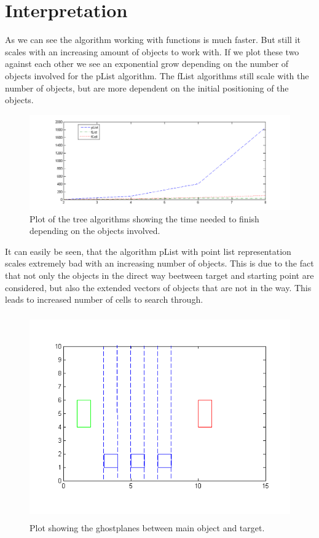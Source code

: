 \section{Interpretation}
As we can see the algorithm working with functions is much faster. But still it scales with an increasing amount of objects to work with.
If we plot these two against each other we see an exponential grow depending on the number of objects involved for the pList algorithm.
The fList algorithms still scale with the number of objects, but are more dependent on the initial positioning of the objects.
\begin{figure}[H]
\includegraphics[width=\textwidth]{pointAgainstFuncAgainstCell.png}
\caption{ Plot of the tree algorithms showing the time needed to finish depending on the objects involved.}
\end{figure}
It can easily be seen, that the algorithm pList with point list representation scales extremely bad with an increasing number of objects. This is due to the fact that not only the objects in the direct way beetween target and starting point are considered, but also the extended vectors of objects that are not in the way. This leads to increased number of cells to search through.
\begin{figure}[H]
\centering
\includegraphics[width=\textwidth, height=250pt]{ghostplanesStep}
\caption{Plot showing the ghostplanes between main object and target.}
\end{figure}
